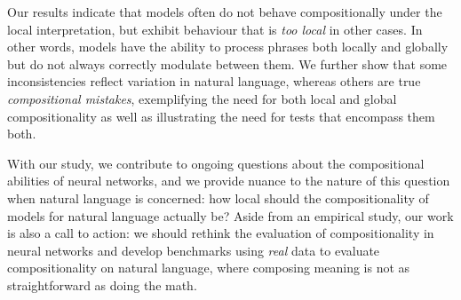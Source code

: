 Our results indicate that models often do not behave compositionally under the local interpretation, but exhibit behaviour that is \emph{too local} in other cases.
In other words, models have the ability to process phrases both locally and globally but do not always correctly modulate between them.
We further show that some inconsistencies reflect variation in natural language, whereas others are true \emph{compositional mistakes}, exemplifying the need for both local and global compositionality as well as illustrating the need for tests that encompass them both.

With our study, we contribute to ongoing questions about the compositional abilities of neural networks, and we provide nuance to the nature of this question when natural language is concerned: how local should the compositionality of models for natural language actually be?
Aside from an empirical study, our work is also a call to action: we should rethink the evaluation of compositionality in neural networks and develop benchmarks using \emph{real} data to evaluate compositionality on natural language, where composing meaning is not as straightforward as doing the math.
